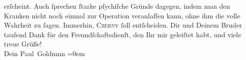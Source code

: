 \begin{ledgroupsized}[t]{13cm}
               erſcheint. Auch ſprechen ſtarke pſychiſche Gründe dagegen, indem man den Kranken nicht noch einmal zur
               Operation veranlaſſen kann, ohne ihm die volle Wahrheit zu ſagen. Immerhin, \textsc{Czerny} ſoll entſcheiden.\pend
           \pstart
           Dir und Deinem Bruder tauſend Dank für
               den Freundſchaftsdienſt, den Ihr mir geleiſtet habt, und viele treue Grüße! {\\[\baselineskip]}Dein
                  \spacefill\mbox{Paul Goldmnn}\pend
           \leftskip=0em{}
         
         \endnumbering{}\end{ledgroupsized}  \newcommand{\dateiname}{L03244}\newcommand{\titel}{Paul Goldmann an Arthur Schnitzler, 20. 4. [1906]}\newcommand{\editorInnen}{Martin Anton Müller und Laura Untner}
      